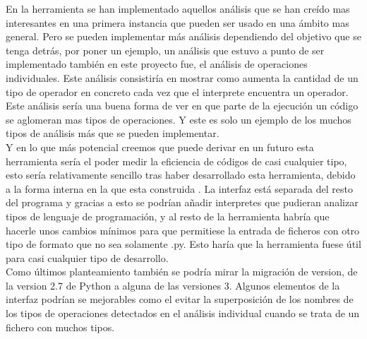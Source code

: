 En la herramienta se han implementado aquellos análisis que se han creído mas interesantes en una primera instancia que pueden ser usado en una ámbito mas general. Pero se pueden implementar más análisis dependiendo del objetivo que se tenga detrás, por poner un ejemplo, un análisis que estuvo a punto de ser implementado también en este proyecto fue, el análisis de operaciones individuales. Este análisis consistiría en mostrar como aumenta la cantidad de un tipo de operador en concreto cada vez que el interprete encuentra un operador. Este análisis sería una buena forma de ver en que parte de la ejecución un código se aglomeran mas tipos de operaciones. Y este es solo un ejemplo de los muchos tipos de análisis más que se pueden implementar.\\

Y en lo que más potencial creemos que puede derivar en un futuro esta herramienta sería el poder medir la eficiencia de códigos de casi cualquier tipo, esto sería relativamente sencillo tras haber desarrollado esta herramienta, debido a la forma interna en la que esta construida . La interfaz está separada del resto del programa y gracias a esto se podrían añadir interpretes que pudieran analizar tipos de lenguaje de programación, y al resto de la herramienta habría que hacerle unos cambios mínimos para que permitiese la entrada de ficheros con otro tipo de formato que no sea solamente .py. Esto haría que la herramienta fuese útil para casi cualquier tipo de desarrollo.\\

Como últimos planteamiento también se podría mirar la migración de version, de la version 2.7 de Python a alguna de las versiones 3.
Algunos elementos de la interfaz podrían se mejorables como el evitar la superposición de los nombres de los tipos de operaciones detectados en el análisis individual cuando se trata de un fichero con muchos tipos.

